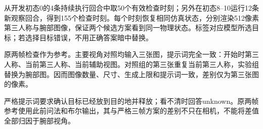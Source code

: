 从开发初态0的4条持续执行回合中取50个有效检查时刻；另外在初态8--10运行12条新观察回合，得到155个检查时刻。每个时刻恢复相同仿真状态，分别渲染512像素第三人称与腕部图像，保证两个候选方案看到同一物理状态。标签对应模型所选目标；若选择目标错误，不用正确答案暗中替换。


原两帧检查作为参考。主要视角对照均输入三张图，提示词完全一致：开始时第三人称、当前第三人称、当前辅助视图。对照组的第三张重复当前第三人称，实验组替换为腕部图。因而图像数量、尺寸、生成上限和提示词一致，差别仅为第三张图的像素。

严格提示词要求确认目标已经放到目的地并释放；看不清时回答unknown。原两帧参考使用此前问法和布尔输出，其与严格三帧方案的差别不只在相机，不能将差值全部归因于腕部视角。


